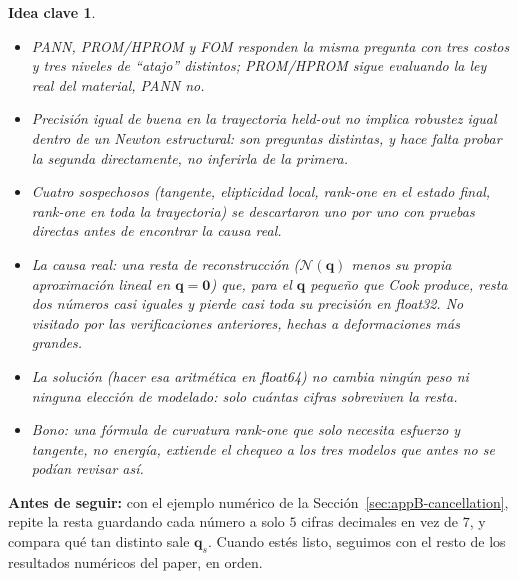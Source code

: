 \documentclass[11pt,a4paper]{article}
\newtheorem{takeaway}{Idea clave}
\begin{document}
\begin{takeaway}
\begin{itemize}
\item PANN, PROM/HPROM y FOM responden la misma pregunta con tres
costos y tres niveles de ``atajo'' distintos; PROM/HPROM sigue
evaluando la ley real del material, PANN no.
\item Precisi\'on igual de buena en la trayectoria held-out no implica
robustez igual dentro de un Newton estructural: son preguntas distintas,
y hace falta probar la segunda directamente, no inferirla de la primera.
\item Cuatro sospechosos (tangente, elipticidad local, rank-one en el
estado final, rank-one en toda la trayectoria) se descartaron uno por
uno con pruebas directas antes de encontrar la causa real.
\item La causa real: una resta de reconstrucci\'on ($\mathcal N(\bm q)$
menos su propia aproximaci\'on lineal en $\bm q=\bm0$) que, para el
$\bm q$ peque\~no que Cook produce, resta dos n\'umeros casi iguales y
pierde casi toda su precisi\'on en float32. No visitado por las
verificaciones anteriores, hechas a deformaciones m\'as grandes.
\item La soluci\'on (hacer esa aritm\'etica en float64) no cambia
ning\'un peso ni ninguna elecci\'on de modelado: solo cu\'antas cifras
sobreviven la resta.
\item Bono: una f\'ormula de curvatura rank-one que solo necesita
esfuerzo y tangente, no energ\'ia, extiende el chequeo a los tres
modelos que antes no se pod\'ian revisar as\'i.
\end{itemize}
\end{takeaway}

\bigskip
\noindent\textbf{Antes de seguir:} con el ejemplo num\'erico de la
Secci\'on~\ref{sec:appB-cancellation}, repite la resta guardando cada
n\'umero a solo $5$ cifras decimales en vez de $7$, y compara qu\'e tan
distinto sale $\bm q_s$. Cuando est\'es listo, seguimos con el resto de
los resultados num\'ericos del paper, en orden.
\end{document}
